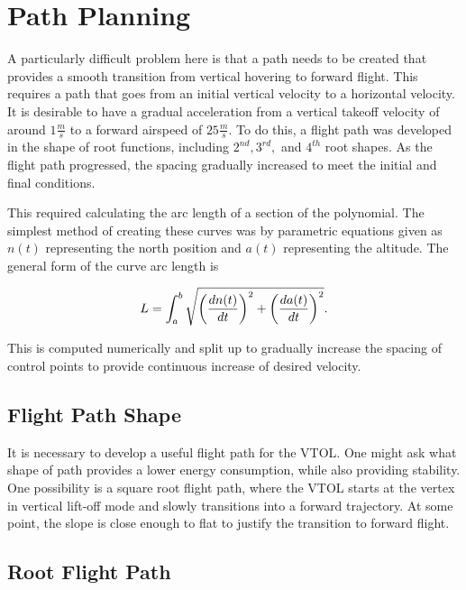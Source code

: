 \section{Path Planning}
\label{sec:vtol path planning}

A particularly difficult problem here is that a path needs to be created that provides a smooth transition from vertical hovering to forward flight. 
This requires a path that goes from an initial vertical velocity to a horizontal velocity. 
It is desirable to have a gradual acceleration from a vertical takeoff velocity of around $1 \frac{m}{s}$ to a forward airspeed of $25 \frac{m}{s}$. 
To do this, a flight path was developed in the shape of root functions, including $2^{nd}, 3^{rd},$ and $4^{th}$ root shapes. 
As the flight path progressed, the spacing gradually increased to meet the initial and final conditions.

This required calculating the arc length of a section of the polynomial. 
The simplest method of creating these curves was by parametric equations given as $n(t)$ representing the north position and $a(t)$ representing the altitude. 
The general form of the curve arc length is

\begin{align}
    L = \int_a^b \sqrt{\left(\frac{d \space n(t)}{dt}\right)^2 + \left(\frac{d \space a(t)}{dt}\right)^2}.
\end{align}

This is computed numerically and split up to gradually increase the spacing of control points to provide continuous increase of desired velocity.

\subsection{Flight Path Shape}

It is necessary to develop a useful flight path for the VTOL. 
One might ask what shape of path provides a lower energy consumption, while also providing stability.
One possibility is a square root flight path, where the VTOL starts at the vertex in vertical lift-off mode and slowly transitions into a forward trajectory. 
At some point, the slope is close enough to flat to justify the transition to forward flight.

\subsection{Root Flight Path}

